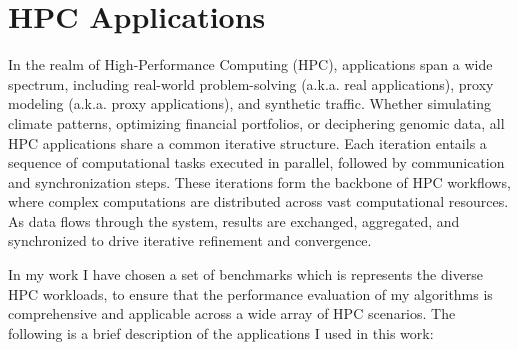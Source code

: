 \section{HPC Applications}
In the realm of High-Performance Computing (HPC), applications span a wide spectrum, including real-world problem-solving (a.k.a. real applications), proxy modeling (a.k.a. proxy applications), and synthetic traffic. Whether simulating climate patterns, optimizing financial portfolios, or deciphering genomic data, all HPC applications share a common iterative structure. Each iteration entails a sequence of computational tasks executed in parallel, followed by communication and synchronization steps. These iterations form the backbone of HPC workflows, where complex computations are distributed across vast computational resources. As data flows through the system, results are exchanged, aggregated, and synchronized to drive iterative refinement and convergence.

In my work I have chosen a set of benchmarks which is represents the diverse HPC workloads, to ensure that the performance evaluation of my algorithms is comprehensive and applicable across a wide array of HPC scenarios.
The following is a brief description of the applications I used in this work:

